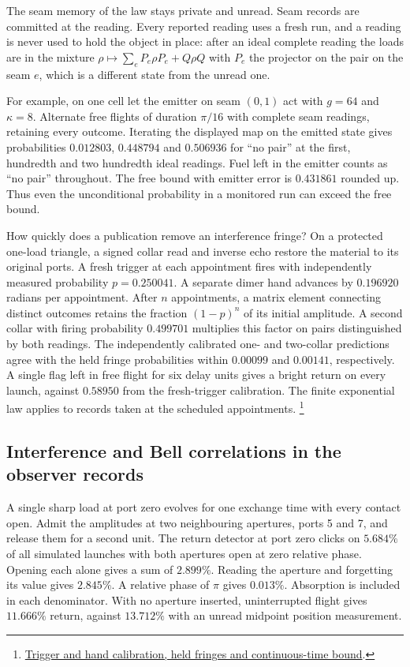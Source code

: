 \documentclass[11pt]{article}
\theoremstyle{definition}
\theoremstyle{remark}
\theoremstyle{plain}
\begin{document}
The seam memory of the law stays private and unread. Seam records are
committed at the reading. Every reported reading uses a fresh run, and a
reading is never used to hold the object in place: after an ideal complete
reading the loads are in the mixture
$\rho\mapsto\sum_eP_e\rho P_e+Q\rho Q$ with $P_e$ the projector on the pair
on the seam $e$, which is a different state from the unread one.

For example, on one cell let the emitter on seam $(0,1)$ act with
$g=64$ and $\kappa=8$. Alternate free flights of duration $\pi/16$ with
complete seam readings, retaining every outcome. Iterating the displayed
map on the emitted state gives probabilities $0.012803$, $0.448794$ and
$0.506936$ for ``no pair'' at the first, hundredth and two hundredth
ideal readings. Fuel left in the emitter counts as ``no pair'' throughout.
The free bound with emitter error is $0.431861$ rounded up. Thus even the
unconditional probability in a monitored run can exceed the free bound.

How quickly does a publication remove an interference fringe? On a
protected one-load triangle, a signed collar read and inverse echo
restore the material to its original ports. A fresh trigger at each
appointment fires with independently measured probability $p=0.250041$.
A separate dimer hand advances by $0.196920$ radians per appointment.
After $n$ appointments, a matrix element connecting distinct outcomes
retains the fraction $(1-p)^n$ of its initial amplitude.
A second collar with firing probability $0.499701$ multiplies this
factor on pairs distinguished by both readings. The independently
calibrated one- and two-collar predictions agree with the held fringe
probabilities within $0.00099$ and $0.00141$, respectively. A single flag
left in free flight for six delay units gives a bright return on every
launch, against $0.58950$ from the fresh-trigger calibration. The finite
exponential law applies to records taken at the scheduled appointments.%
\footnote{\href{https://github.com/FloatingPragma/observer-patch-holography/tree/main/model/experiments/interval_echo_consensus/publication_rate}{Trigger and hand calibration, held fringes and continuous-time bound}.}

\subsection{Interference and Bell correlations in the observer records}

A single sharp load at port zero evolves for one exchange time with
every contact open. Admit the amplitudes at two neighbouring apertures,
ports 5 and 7, and release them for a second unit. The return detector
at port zero clicks on $5.684\%$ of all simulated launches with both
apertures open at zero relative phase. Opening each alone gives a sum
of $2.899\%$. Reading the aperture and forgetting its value gives
$2.845\%$. A relative phase of $\pi$ gives $0.013\%$. Absorption is
included in each denominator. With no aperture inserted, uninterrupted
flight gives $11.666\%$ return, against $13.712\%$ with an unread
midpoint position measurement.
\end{document}
